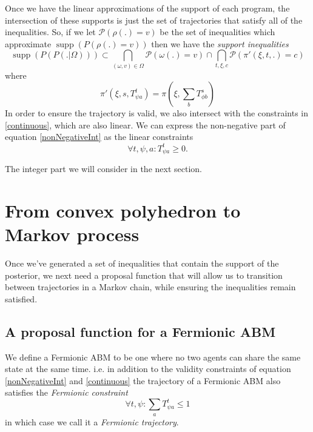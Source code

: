 \documentclass{article}
\DeclareMathOperator\supp{supp}
\begin{document}
Once we have the linear approximations of the support of each program, the intersection of these supports is just the set of trajectories that satisfy all of the inequalities. So, if we let $\mathcal{P}(\rho(.)=v)$ be the set of inequalities which approximate $\supp(P(\rho(.)=v))$ then we have the \textit{support inequalities}
\begin{equation}
\supp(P(P(.|\Omega))) \subset \bigcap_{(\omega,v) \in \Omega}  \mathcal{P}(\omega(.) = v) \cap \bigcap_{t, \xi, c} \mathcal{P}(\pi'(\xi,t,.)=c)
\label{linearSupport}
\end{equation}
where
\[
\pi'(\xi, s, T^t_{\psi a}) = \pi(\xi,\sum_bT^{s}_{\phi b})
\]
In order to ensure the trajectory is valid, we also intersect with the constraints in \ref{continuous}, which are also linear. We can express the non-negative part of equation \ref{nonNegativeInt} as the linear constraints
\begin{equation}
\forall t, \psi, a: T^t_{\psi a} \ge 0.
\label{nonNegative}
\end{equation}

The integer part we will consider in the next section.

\section{From convex polyhedron to Markov process}

Once we've generated a set of inequalities that contain the support of the posterior, we next need a proposal function that will allow us to transition between trajectories in a Markov chain, while ensuring the inequalities remain satisfied.

\subsection{A proposal function for a Fermionic ABM}

We define a Fermionic ABM to be one where no two agents can share the same state at the same time. i.e. in addition to the validity constraints of equation \ref{nonNegativeInt} and \ref{continuous} the trajectory of a Fermionic ABM also satisfies the \textit{Fermionic constraint}
\begin{equation}
\forall t,\psi: \sum_a T^t_{\psi a} \le 1
\label{fermionic}
\end{equation}
in which case we call it a \textit{Fermionic trajectory}.
\end{document}
